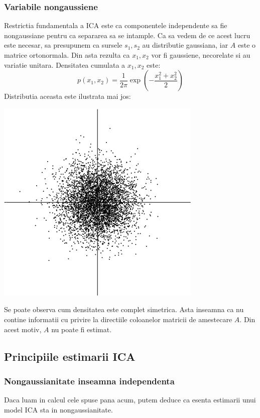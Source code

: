 \documentclass[12pt]{article}
\begin{document}
\subsubsection{Variabile nongaussiene}
Restrictia fundamentala a ICA este ca componentele independente sa fie nongaussiane pentru ca separarea sa se intample. Ca sa vedem de ce acest lucru este necesar, sa presupunem ca sursele $s_1, s_2$ au distributie gaussiana, iar $A$ este o matrice ortonormala. Din asta rezulta ca $x_1,x_2$ vor fi gaussiene, necorelate si au variatie unitara. Densitatea cumulata a $x_1, x_2$ este:
\begin{equation}
	p(x_1,x_2)=\frac{1}{2\pi}\exp(-\frac{x_1^2+x_2^2}{2})
\end{equation}
\newpage
Distributia aceasta este ilustrata mai jos:
\begin{center}
	\includegraphics[scale=0.8]{multivariate_gaussian_distribution}
 \end{center}
 Se poate observa cum densitatea este complet simetrica. Asta inseamna ca nu contine informatii cu privire la directiile coloanelor matricii de amestecare $A$. Din acest motiv, $A$ nu poate fi estimat.

 \subsection{Principiile estimarii ICA}
 \subsubsection{Nongaussianitate inseamna independenta}
 Daca luam in calcul cele spuse pana acum, putem deduce ca esenta estimarii unui model ICA sta in nongaussianitate.
\end{document}
